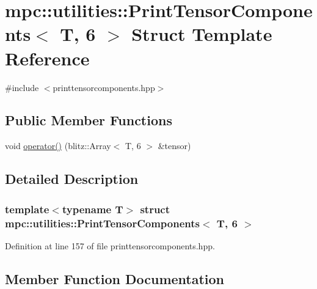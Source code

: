 \hypertarget{structmpc_1_1utilities_1_1_print_tensor_components_3_01_t_00_016_01_4}{}\section{mpc\+:\+:utilities\+:\+:Print\+Tensor\+Components$<$ T, 6 $>$ Struct Template Reference}
\label{structmpc_1_1utilities_1_1_print_tensor_components_3_01_t_00_016_01_4}


{\ttfamily \#include $<$printtensorcomponents.\+hpp$>$}

\subsection*{Public Member Functions}
\begin{DoxyCompactItemize}
\item 
void \mbox{\hyperlink{structmpc_1_1utilities_1_1_print_tensor_components_3_01_t_00_016_01_4_aa9050aea8d8ebfa15363dc4ef0bcfb05}{operator()}} (blitz\+::\+Array$<$ T, 6 $>$ \&tensor)
\end{DoxyCompactItemize}


\subsection{Detailed Description}
\subsubsection*{template$<$typename T$>$\newline
struct mpc\+::utilities\+::\+Print\+Tensor\+Components$<$ T, 6 $>$}



Definition at line 157 of file printtensorcomponents.\+hpp.



\subsection{Member Function Documentation}
\mbox{\label{structmpc_1_1utilities_1_1_print_tensor_components_3_01_t_00_016_01_4_aa9050aea8d8ebfa15363dc4ef0bcfb05}} 
